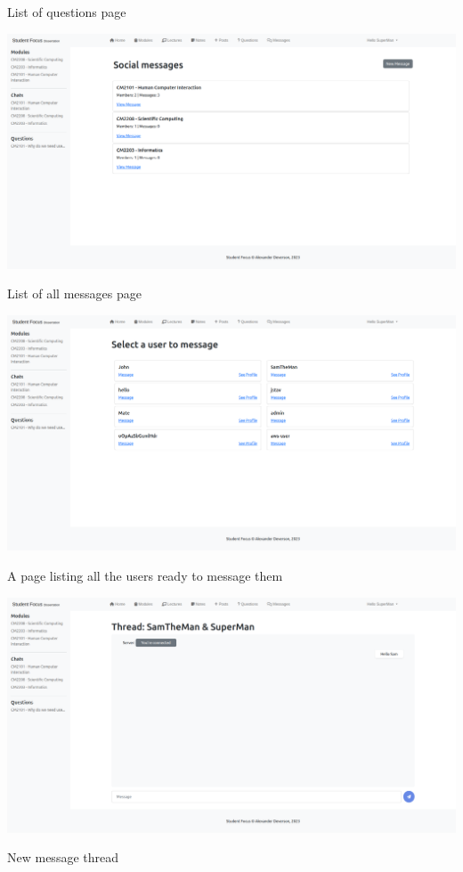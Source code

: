 List of questions page

\includegraphics[scale=0.20]{images/application/22 - all_messages.png}

List of all messages page

\includegraphics[scale=0.20]{images/application/23 - new_message.png}

A page listing all the users ready to message them

\includegraphics[scale=0.20]{images/application/24 - sending_sam_a_message.png}

New message thread


